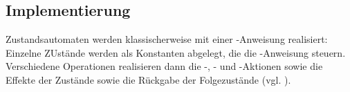 \subsection{Implementierung}
Zustandsautomaten werden klassischerweise mit einer -Anweisung realisiert: Einzelne ZUstände werden als Konstanten abgelegt, die die -Anweisung steuern.\\
Verschiedene Operationen realisieren dann die -, - und -Aktionen sowie die Effekte der Zustände sowie die Rückgabe der Folgezustände (vgl. \cite[75]{Buh09}).